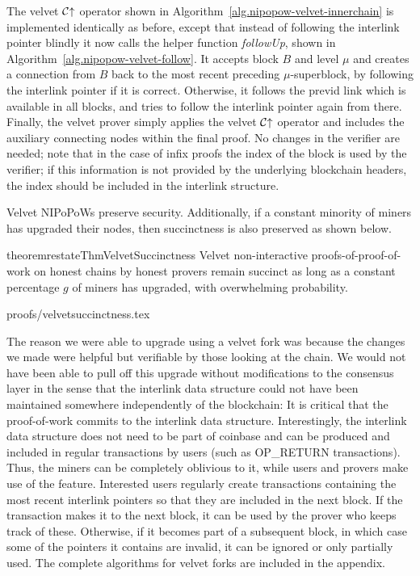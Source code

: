 The velvet $\mathcal{C}\negthickspace\uparrow$ operator
shown in Algorithm~\ref{alg.nipopow-velvet-innerchain}
is implemented identically as before, except that instead of following the
interlink pointer blindly it now calls the helper function \textit{followUp},
shown in Algorithm~\ref{alg.nipopow-velvet-follow}. It accepts block $B$ and
level $\mu$ and creates a connection from $B$ back to the most recent preceding
$\mu$-superblock, by following the interlink pointer if it is correct.
Otherwise, it follows the previd link which is available in all blocks, and
tries to follow the interlink pointer again from there. Finally, the velvet
prover
simply applies the velvet $\mathcal{C}\negthickspace\uparrow$ operator and includes the auxiliary
connecting nodes within the final proof. No changes in the verifier are needed; note that  in the case of infix proofs the $\mathrm{index}$ of the block is used by the verifier; if this information is not provided by the underlying blockchain headers, the index should be included in the interlink structure.


Velvet NIPoPoWs preserve security. Additionally, if a constant minority of
miners has upgraded their nodes, then succinctness is also preserved
as shown below.

\begin{restatable}{theorem}{restateThmVelvetSuccinctness}
    \label{thm.velvet-succinctness}
    Velvet non-interactive proofs-of-proof-of-work on honest chains by honest
    provers remain succinct as long as a constant percentage $g$ of miners has
    upgraded, with overwhelming probability.
\end{restatable}

\ifonecolumn
{proofs/velvetsuccinctness.tex}
\fi

The reason we were able to upgrade using a velvet fork was because the changes
we made were helpful but verifiable by those looking at the chain. We would not
have been able to pull off this upgrade without modifications to the consensus
layer in the sense that the interlink data structure could not have been
maintained somewhere independently of the blockchain: It is critical that the
proof-of-work commits to the interlink data structure. Interestingly, the
interlink data structure does not need to be part of coinbase and can be
produced and included in regular transactions by users (such as OP\_RETURN
transactions). Thus, the miners can be completely oblivious to it, while users
and provers make use of the feature. Interested users regularly create
transactions containing the most recent interlink pointers so that they are
included in the next block. If the transaction makes it to the next block, it
can be used by the prover who keeps track of these. Otherwise, if it becomes
part of a subsequent block, in which case some of the pointers it contains are
invalid, it can be ignored or only partially used. The complete algorithms for
velvet forks are included in the appendix.


